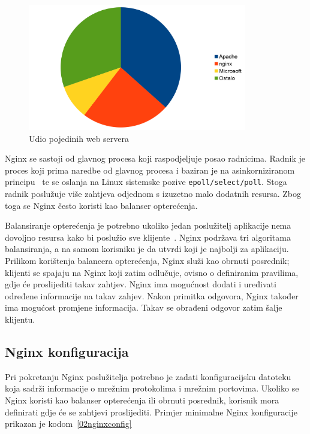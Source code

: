 \begin{figure}[h]
    \centering
    \includegraphics[width=0.85\textwidth]{img/02/nginx_ratio.png}
    \caption{Udio pojedinih web servera}%
    \label{fig:02nginx_ratio}
\end{figure}

Nginx se sastoji od glavnog procesa koji raspodjeljuje posao radnicima. Radnik je proces koji prima
naredbe od glavnog procesa i baziran je na asinkorniziranom principu~\citep{reese2008nginx} te se
oslanja na Linux sistemske pozive \texttt{epoll/select/poll}. Stoga radnik poslužuje više zahtjeva
odjednom s izuzetno malo dodatnih resursa. Zbog toga se Nginx često koristi kao balanser
opterećenja.

Balansiranje opterećenja je potrebno ukoliko jedan poslužitelj aplikacije nema dovoljno resursa kako
bi poslužio sve klijente~\citep{soni2016load}. Nginx podržava tri algoritama balansiranja, a na
samom korisniku je da utvrdi koji je najbolji za aplikaciju. Prilikom korištenja balancera
opterećenja, Nginx služi kao obrnuti posrednik; klijenti se spajaju na Nginx koji zatim odlučuje,
ovisno o definiranim pravilima, gdje će proslijediti takav zahtjev. Nginx ima mogućnost dodati i
uređivati određene informacije na takav zahjev. Nakon primitka odgovora, Nginx također ima mogućost
promjene informacija. Takav se obrađeni odgovor zatim šalje klijentu.

\subsection{Nginx konfiguracija}
Pri pokretanju Nginx poslužitelja potrebno je zadati konfiguracijsku datoteku koja sadrži
informacije o mrežnim protokolima i mrežnim portovima. Ukoliko se Nginx koristi kao balanser
opterećenja ili obrnuti posrednik, korisnik mora definirati gdje će se zahtjevi proslijediti.
Primjer minimalne Nginx konfiguracije prikazan je kodom~\ref{02nginxconfig}


